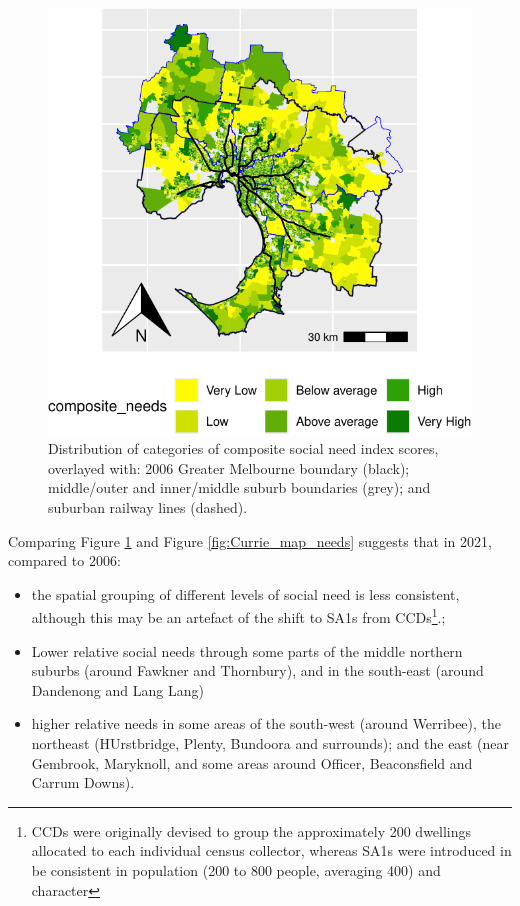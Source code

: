 \documentclass[preprint, 3p,
authoryear]{elsarticle} %
\providecommand{\tightlist}{%
  \setlength{\itemsep}{0pt}\setlength{\parskip}{0pt}}
\begin{document}
\begin{figure}
\includegraphics[width=0.9\linewidth]{Leveraging_GTFS_to_assess_transit_supply_Transport_Geography_files/figure-latex/Greater_Melbourne_2021_social_needs-1} \caption{Distribution of categories of composite social need index scores, overlayed with: 2006 Greater Melbourne boundary (black); middle/outer and inner/middle suburb boundaries (grey); and suburban railway lines (dashed).}\label{fig:Greater_Melbourne_2021_social_needs}
\end{figure}

Comparing Figure \ref{fig:Greater_Melbourne_2021_social_needs} and
Figure \ref{fig:Currie_map_needs} suggests that in 2021, compared to
2006:

\begin{itemize}
\tightlist
\item
  the spatial grouping of different levels of social need is less
  consistent, although this may be an artefact of the shift to SA1s from
  CCDs\footnote{CCDs were originally devised to group the approximately
    200 dwellings allocated to each individual census collector, whereas
    SA1s were introduced in be consistent in population (200 to 800
    people, averaging 400) and character\citep{ABS_SA1s_CCDs}}.;
\item
  Lower relative social needs through some parts of the middle northern
  suburbs (around Fawkner and Thornbury), and in the south-east (around
  Dandenong and Lang Lang)
\item
  higher relative needs in some areas of the south-west (around
  Werribee), the northeast (HUrstbridge, Plenty, Bundoora and
  surrounds); and the east (near Gembrook, Maryknoll, and some areas
  around Officer, Beaconsfield and Carrum Downs).
\end{itemize}
\end{document}

